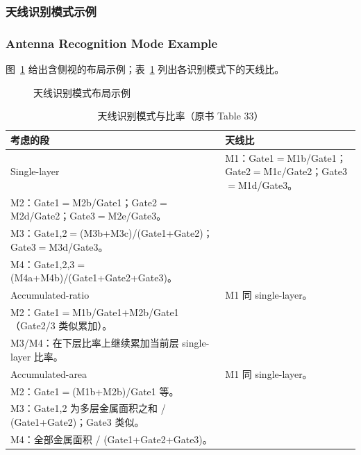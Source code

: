 \subsubsection{天线识别模式示例}
\subsubsection*{Antenna Recognition Mode Example}

图~\ref{fig:antenna-recog-layout} 给出含侧视的布局示例；表~\ref{tab:antenna-recog-ratios} 列出各识别模式下的天线比。

\begin{figure}[htbp]
\centering
{}
\caption{天线识别模式布局示例}
\label{fig:antenna-recog-layout}
\end{figure}

\begin{table}[htbp]
\centering
\caption{天线识别模式与比率（原书 Table 33）}
\label{tab:antenna-recog-ratios}
\begin{tabular}{@{}lp{}@{}}
\toprule
考虑的段 & 天线比 \\
\midrule
Single-layer &
M1：Gate1$=$M1b/Gate1；Gate2$=$M1c/Gate2；Gate3$=$M1d/Gate3。\\
M2：Gate1$=$M2b/Gate1；Gate2$=$M2d/Gate2；Gate3$=$M2e/Gate3。\\
M3：Gate1,2$=$(M3b+M3c)/(Gate1+Gate2)；Gate3$=$M3d/Gate3。\\
M4：Gate1,2,3$=$(M4a+M4b)/(Gate1+Gate2+Gate3)。 \\
\midrule
Accumulated-ratio &
M1 同 single-layer。\\
M2：Gate1$=$M1b/Gate1$+$M2b/Gate1（Gate2/3 类似累加）。\\
M3/M4：在下层比率上继续累加当前层 single-layer 比率。 \\
\midrule
Accumulated-area &
M1 同 single-layer。\\
M2：Gate1$=$(M1b+M2b)/Gate1 等。\\
M3：Gate1,2 为多层金属面积之和 / (Gate1+Gate2)；Gate3 类似。\\
M4：全部金属面积 / (Gate1+Gate2+Gate3)。 \\
\bottomrule
\end{tabular}
\end{table}

